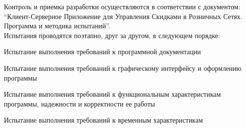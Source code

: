Контроль и приемка разработки осуществляются в соответствии с документом: 
``Клиент-Серверное Приложение для Управления Скидками в Розничных Сетях. 
Программа и методика испытаний''. \\
Испытания проводятся поэтапно, друг за другом, в следующем порядке:
\begin{my_enumerate}
	\item Испытание выполнения требований к программной документации
	\item Испытание выполнения требований к графическому интерфейсу и оформлению программы
	\item Испытание выполнения требований к функциональным характеристикам программы, надежности и корректности ее работы
	\item Испытание выполнения требований к временным характеристикам
\end{my_enumerate}
